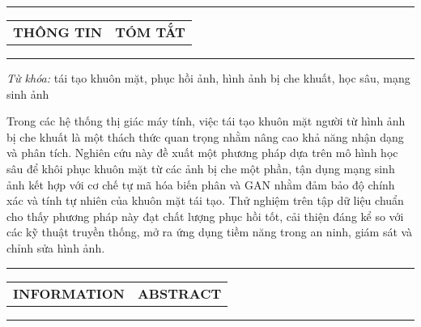 \documentclass[12pt,a4paper]{article}
\title{\vspace{-2em}
	\textbf{\MakeUppercase{\parbox{\linewidth}{\centering
				TÁI TẠO KHUÔN MẶT NGƯỜI TỪ HÌNH ẢNH BỊ CHE KHUẤT BẰNG PHƯƠNG PHÁP MÔ HÌNH HỌC SÂU}}}}
\author{
	Phạm Phước Minh Hiếu*, Cao Sỹ Siêu\\
	\small Trường Đại học Quản lý và Công nghệ Thành Phố Hồ Chí Minh\\
	\small \textit{*Tác giả liên hệ: hieu.2201700085@st.umt.edu.vn}
}
\date{}
\begin{document}
	
	\maketitle
	
	\vspace{-0.8em}
	\noindent\rule{\textwidth}{0.6pt}
	
	\vspace{0.3em}
	
	\noindent
	\begin{tabularx}{\textwidth}{X X}
		\centering\textbf{\MakeUppercase{THÔNG TIN}} & \centering\textbf{\MakeUppercase{TÓM TẮT}} \tabularnewline
	\end{tabularx}
	
	\vspace{0.3em}
	\noindent\rule{\textwidth}{0.6pt}
	
	\begin{multicols}{2}
		\noindent
		\textit{Từ khóa:} tái tạo khuôn mặt, phục hồi ảnh, hình ảnh bị che khuất, học sâu, mạng sinh ảnh
		
		\columnbreak
		
		Trong các hệ thống thị giác máy tính, việc tái tạo khuôn mặt người từ hình ảnh bị che khuất là một thách thức quan trọng nhằm nâng cao khả năng nhận dạng và phân tích. Nghiên cứu này đề xuất một phương pháp dựa trên mô hình học sâu để khôi phục khuôn mặt từ các ảnh bị che một phần, tận dụng mạng sinh ảnh kết hợp với cơ chế tự mã hóa biến phân và GAN nhằm đảm bảo độ chính xác và tính tự nhiên của khuôn mặt tái tạo. Thử nghiệm trên tập dữ liệu chuẩn cho thấy phương pháp này đạt chất lượng phục hồi tốt, cải thiện đáng kể so với các kỹ thuật truyền thống, mở ra ứng dụng tiềm năng trong an ninh, giám sát và chỉnh sửa hình ảnh.
	\end{multicols}
	
	\vspace{-0.4em}
	\noindent\rule{\textwidth}{0.6pt}
	
	\noindent
	\begin{tabularx}{\textwidth}{X X}
		\centering\textbf{\MakeUppercase{INFORMATION}} & \centering\textbf{\MakeUppercase{ABSTRACT}} \tabularnewline
	\end{tabularx}
	
	\vspace{0.3em}
	
	\noindent\rule{\textwidth}{0.6pt}
	
\end{document}
